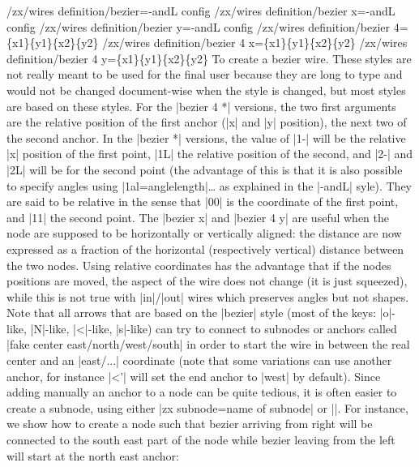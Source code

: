 \documentclass[a4paper,doc2]{ltxdoc} %
\begin{document}
{\begin{pgfmanualentry}
  \makeatletter
  \def\extrakeytext{style, }
  \extractkey/zx/wires definition/bezier=-andL config \@nil%
  \extractkey/zx/wires definition/bezier x=-andL config \@nil%
  \extractkey/zx/wires definition/bezier y=-andL config \@nil%
  \extractkey/zx/wires definition/bezier 4=\{x1\}\{y1\}\{x2\}\{y2\} \@nil%
  \extractkey/zx/wires definition/bezier 4 x=\{x1\}\{y1\}\{x2\}\{y2\} \@nil%
  \extractkey/zx/wires definition/bezier 4 y=\{x1\}\{y1\}\{x2\}\{y2\} \@nil%
  \makeatother
  \pgfmanualbody
  To create a bezier wire. These styles are not really meant to be used for the final user because they are long to type and would not be changed document-wise when the style is changed, but most styles are based on these styles. For the |bezier 4 *| versions, the two first arguments are the relative position of the first anchor (|x| and |y| position), the next two of the second anchor. In the |bezier *| versions, the value of |1-| will be the relative |x| position of the first point, |1L| the relative position of the second, and |2-| and |2L| will be for the second point (the advantage of this is that it is also possible to specify angles using |1al={angle}{length}|\dots{} as explained in the |-andL| syle). They are said to be relative in the sense that |{0}{0}| is the coordinate of the first point, and |{1}{1}| the second point. The |bezier x| and |bezier 4 y| are useful when the node are supposed to be horizontally or vertically aligned: the distance are now expressed as a fraction of the horizontal (respectively vertical) distance between the two nodes. Using relative coordinates has the advantage that if the nodes positions are moved, the aspect of the wire does not change (it is just squeezed), while this is not true with |in|/|out| wires which preserves angles but not shapes.
Note that all arrows that are based on the |bezier| style (most of the keys: |o|-like, |N|-like, |<|-like, |s|-like) can try to connect to subnodes or anchors called |fake center {east/north/west/south}| in order to start the wire in between the real center and an |east/...| coordinate (note that some variations can use another anchor, for instance |<'| will set the end anchor to |west| by default). Since adding manually an anchor to a node can be quite tedious, it is often easier to create a subnode, using either |zx subnode=name of subnode| or ||. For instance, we show how to create a node such that bezier arriving from right will be connected to the south east part of the node while bezier leaving from the left will start at the north east anchor:
\begin{codeexample}[width=0pt]


\end{codeexample}
\end{pgfmanualentry}}
\end{document}
